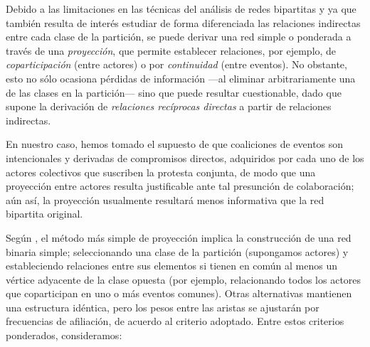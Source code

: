\documentclass[letterpaper, 11pt]{book}
\theoremstyle{definition}
\theoremstyle{remark}
\begin{document}
Debido a las limitaciones en las técnicas del análisis de redes bipartitas y ya que también resulta de interés estudiar de forma diferenciada las relaciones indirectas entre cada clase de la partición, se puede derivar una red simple o ponderada a través de una \emph{proyección}, que permite establecer relaciones, por ejemplo, de \emph{coparticipación} (entre actores) o por \emph{continuidad} (entre eventos). 
No obstante, esto no sólo ocasiona pérdidas de información ---al eliminar arbitrariamente una de las clases en la partición--- sino que puede resultar cuestionable, dado que supone la derivación de \emph{relaciones recíprocas directas} a partir de relaciones indirectas. 

En nuestro caso, hemos tomado el supuesto de que coaliciones de eventos son intencionales y derivadas de compromisos directos, adquiridos por cada uno de los actores colectivos que suscriben la protesta conjunta, de modo que una proyección entre actores resulta justificable ante tal presunción de colaboración; aún así, la proyección usualmente resultará menos informativa que la red bipartita original. 


Según \citet{2013_Opsahl_BipartiteCluster}, el método más simple de proyección implica la construcción de una red binaria simple; seleccionando una clase de la partición (supongamos actores) y estableciendo relaciones entre sus elementos si tienen en común al menos un vértice adyacente de la clase opuesta (por ejemplo, relacionando todos los actores que coparticipan en uno o más eventos comunes). 
Otras alternativas mantienen una estructura idéntica, pero los pesos entre las aristas se ajustarán por frecuencias de afiliación, de acuerdo al criterio adoptado. 
Entre estos criterios ponderados, consideramos: 
\end{document}
